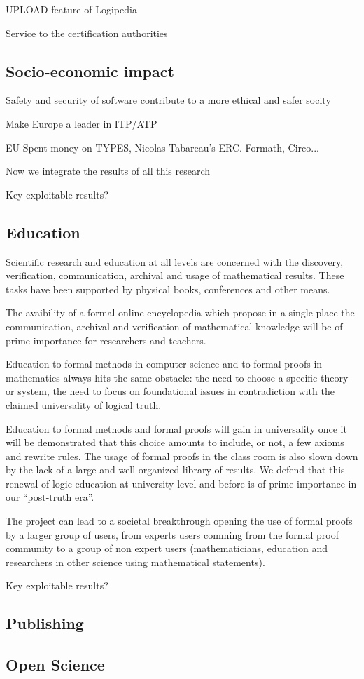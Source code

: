 UPLOAD feature of Logipedia

Service to the certification authorities

\subsection{Socio-economic impact}

{\color{red} Safety and security of software contribute to a more ethical
  and safer socity}

Make Europe a leader in ITP/ATP

EU Spent money on TYPES, Nicolas Tabareau's ERC. Formath, Circo... 

Now we integrate the results of all this research

{\color{red} Key exploitable results?}

\subsection{Education}

Scientific research and education at all levels are concerned with the discovery, verification, communication, archival and usage of mathematical results.
These tasks have been supported by physical books, conferences and other means.

The avaibility of a formal online encyclopedia which propose in a single place the communication, archival and verification of mathematical  knowledge will be of prime importance for researchers and teachers.

Education to formal methods in computer science and to formal proofs
in mathematics always hits the same obstacle: the need to choose a
specific theory or system, the need to focus on foundational issues in contradiction with the claimed universality of logical truth. 

Education to formal methods and formal proofs will gain in universality once it will be demonstrated that this choice amounts to include, or not, a few axioms and rewrite
rules. 
The usage of formal proofs in the class room is also slown down by the lack of a large and well organized library of results.
We defend that this renewal of logic education at university level and before is of prime importance in our ``post-truth era''.

The project can lead to a societal breakthrough opening the use of formal proofs by a larger group of users, from experts users comming from the formal proof community  to a group of non expert users (mathematicians, education and researchers in other science using mathematical statements). 

{\color{red} Key exploitable results?}


\subsection{Publishing}

\subsection{Open Science}


